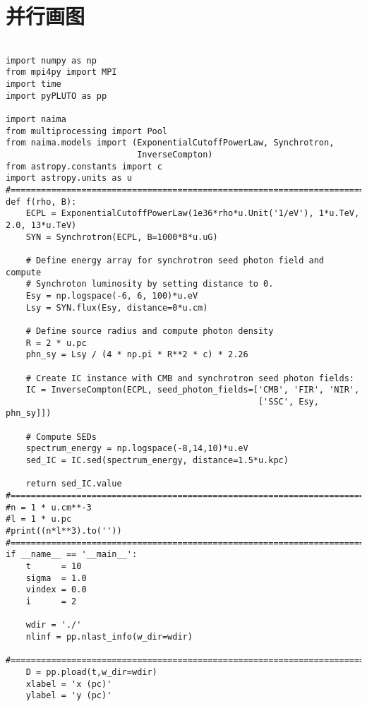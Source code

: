 \section{并行画图}
\label{mpi4py}

\begin{lstlisting}

import numpy as np
from mpi4py import MPI
import time
import pyPLUTO as pp

import naima
from multiprocessing import Pool
from naima.models import (ExponentialCutoffPowerLaw, Synchrotron,
                          InverseCompton)
from astropy.constants import c
import astropy.units as u
#==============================================================================
def f(rho, B):
    ECPL = ExponentialCutoffPowerLaw(1e36*rho*u.Unit('1/eV'), 1*u.TeV, 2.0, 13*u.TeV)
    SYN = Synchrotron(ECPL, B=1000*B*u.uG)

    # Define energy array for synchrotron seed photon field and compute
    # Synchroton luminosity by setting distance to 0.
    Esy = np.logspace(-6, 6, 100)*u.eV
    Lsy = SYN.flux(Esy, distance=0*u.cm)

    # Define source radius and compute photon density
    R = 2 * u.pc
    phn_sy = Lsy / (4 * np.pi * R**2 * c) * 2.26

    # Create IC instance with CMB and synchrotron seed photon fields:
    IC = InverseCompton(ECPL, seed_photon_fields=['CMB', 'FIR', 'NIR',
                                                  ['SSC', Esy, phn_sy]])

    # Compute SEDs
    spectrum_energy = np.logspace(-8,14,10)*u.eV
    sed_IC = IC.sed(spectrum_energy, distance=1.5*u.kpc)

    return sed_IC.value
#==============================================================================
#n = 1 * u.cm**-3
#l = 1 * u.pc
#print((n*l**3).to(''))
#==============================================================================
if __name__ == '__main__':
    t      = 10
    sigma  = 1.0
    vindex = 0.0
    i      = 2

    wdir = './'
    nlinf = pp.nlast_info(w_dir=wdir)

#==============================================================================
    D = pp.pload(t,w_dir=wdir)
    xlabel = 'x (pc)'
    ylabel = 'y (pc)'

\end{lstlisting}
